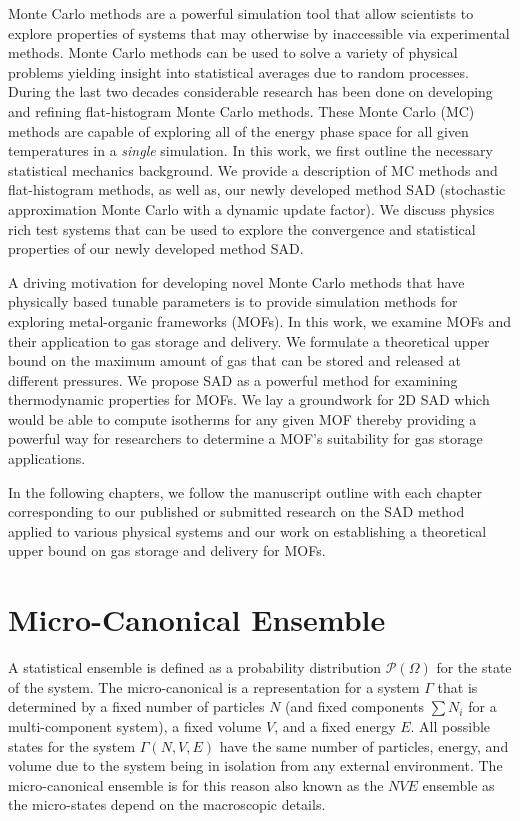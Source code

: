 Monte Carlo methods are a powerful simulation tool that allow scientists to explore properties of systems that may otherwise by inaccessible via experimental methods. Monte Carlo methods can be used to solve a variety of physical problems yielding insight into statistical averages due to random processes. During the last two decades considerable research has been done on developing and refining flat-histogram Monte Carlo methods.  These Monte Carlo (MC) methods are capable of exploring all of the energy phase space for all given temperatures in a \emph{single} simulation. In this work, we first outline the necessary statistical mechanics background. We provide a description of MC methods and flat-histogram methods, as well as, our newly developed method SAD (stochastic approximation Monte Carlo with a dynamic update factor). We discuss physics rich test systems that can be used to explore the convergence and statistical properties of our newly developed method SAD. 

A driving motivation for developing novel Monte Carlo methods that have physically based tunable parameters is to provide simulation methods for exploring metal-organic frameworks (MOFs). In this work, we examine MOFs and
their application to gas storage and delivery. We formulate a theoretical upper
bound on the maximum amount of gas that can be stored and released at different
pressures. We propose SAD as a powerful method for examining thermodynamic properties for MOFs.  We lay a groundwork for 2D SAD which would be able to compute isotherms for any given MOF thereby providing a powerful way for researchers to determine a MOF's suitability for gas storage applications.

In the following chapters, we follow the manuscript outline with each chapter corresponding to our published or submitted research on the SAD method applied to various physical systems and our work on establishing a theoretical upper bound on gas storage and delivery for MOFs.

\section{Micro-Canonical Ensemble}\label{micro}
A statistical ensemble is defined as a probability distribution $\mathcal{P}\left(\Omega\right)$ for the state of the system.
The micro-canonical is a representation for a system $\Gamma$ that is determined by a fixed number of particles $N$ (and fixed components $\sum N_i$ for a multi-component system), a fixed volume $V$, and a fixed energy $E$. All possible states for the system $\Gamma\left(N,V,E\right)$ have the same number of particles, energy, and volume due to the system being in isolation from any external environment.
The micro-canonical ensemble is for this reason also known as the $NVE$ ensemble as the micro-states depend on the  macroscopic details.

